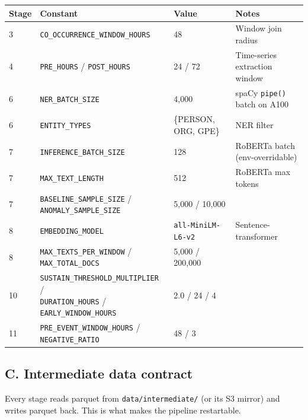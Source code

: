 \documentclass[
]{article}
\begin{document}
\begin{table}[H]
\centering
\begin{adjustbox}{max width=\textwidth}
\begin{tabular}{@{}llll@{}}
\toprule
Stage & Constant & Value & Notes \\
\midrule
3  & \texttt{CO\_OCCURRENCE\_WINDOW\_HOURS}
   & 48
   & Window join radius \\
4  & \texttt{PRE\_HOURS} / \texttt{POST\_HOURS}
   & 24 / 72
   & Time-series extraction window \\
6  & \texttt{NER\_BATCH\_SIZE}
   & 4,000
   & spaCy \texttt{pipe()} batch on A100 \\
6  & \texttt{ENTITY\_TYPES}
   & \{PERSON, ORG, GPE\}
   & NER filter \\
7  & \texttt{INFERENCE\_BATCH\_SIZE}
   & 128
   & RoBERTa batch (env-overridable) \\
7  & \texttt{MAX\_TEXT\_LENGTH}
   & 512
   & RoBERTa max tokens \\
7  & \makecell[l]{\texttt{BASELINE\_SAMPLE\_SIZE} /\\ \texttt{ANOMALY\_SAMPLE\_SIZE}}
   & 5,000 / 10,000
   & \\
8  & \texttt{EMBEDDING\_MODEL}
   & \texttt{all-MiniLM-L6-v2}
   & Sentence-transformer \\
8  & \makecell[l]{\texttt{MAX\_TEXTS\_PER\_WINDOW} /\\ \texttt{MAX\_TOTAL\_DOCS}}
   & 5,000 / 200,000
   & \\
10 & \makecell[l]{\texttt{SUSTAIN\_THRESHOLD\_MULTIPLIER} /\\ \texttt{DURATION\_HOURS} / \texttt{EARLY\_WINDOW\_HOURS}}
   & 2.0 / 24 / 4
   & \\
11 & \makecell[l]{\texttt{PRE\_EVENT\_WINDOW\_HOURS} /\\ \texttt{NEGATIVE\_RATIO}}
   & 48 / 3
   & \\
\bottomrule
\end{tabular}
\end{adjustbox}
\end{table}

\subsection{C. Intermediate data
contract}\label{c-intermediate-data-contract}

Every stage reads parquet from \texttt{data/intermediate/} (or its S3
mirror) and writes parquet back. This is what makes the pipeline
restartable.
\end{document}

